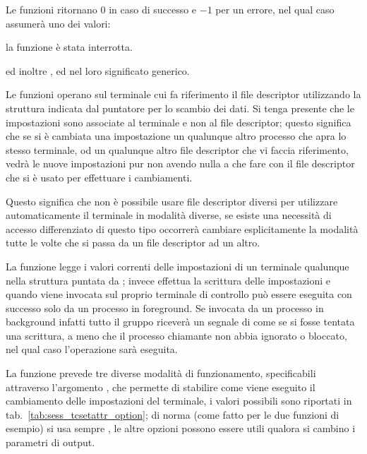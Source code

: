 \begin{funcproto}{

}

{Le funzioni ritornano $0$ in caso di successo e $-1$ per un errore, nel qual
  caso  assumerà uno dei valori: 
  \begin{errlist}
    \item[\errcode{EINTR}] la funzione è stata interrotta. 
  \end{errlist}
  ed inoltre ,  ed  nel loro
  significato generico.}
\end{funcproto}


Le funzioni operano sul terminale cui fa riferimento il file descriptor
 utilizzando la struttura indicata dal puntatore 
per lo scambio dei dati. Si tenga presente che le impostazioni sono associate
al terminale e non al file descriptor; questo significa che se si è cambiata
una impostazione un qualunque altro processo che apra lo stesso terminale, od
un qualunque altro file descriptor che vi faccia riferimento, vedrà le nuove
impostazioni pur non avendo nulla a che fare con il file descriptor che si è
usato per effettuare i cambiamenti.

Questo significa che non è possibile usare file descriptor diversi per
utilizzare automaticamente il terminale in modalità diverse, se esiste una
necessità di accesso differenziato di questo tipo occorrerà cambiare
esplicitamente la modalità tutte le volte che si passa da un file descriptor
ad un altro.

La funzione  legge i valori correnti delle impostazioni di un
terminale qualunque nella struttura puntata da ;
 invece effettua la scrittura delle impostazioni e quando
viene invocata sul proprio terminale di controllo può essere eseguita con
successo solo da un processo in foreground.  Se invocata da un processo in
background infatti tutto il gruppo riceverà un segnale di  come
se si fosse tentata una scrittura, a meno che il processo chiamante non abbia
 ignorato o bloccato, nel qual caso l'operazione sarà eseguita.

La funzione  prevede tre diverse modalità di funzionamento,
specificabili attraverso l'argomento , che permette
di stabilire come viene eseguito il cambiamento delle impostazioni del
terminale, i valori possibili sono riportati in
tab.~\ref{tab:sess_tcsetattr_option}; di norma (come fatto per le due funzioni
di esempio) si usa sempre , le altre opzioni possono essere
utili qualora si cambino i parametri di output.

